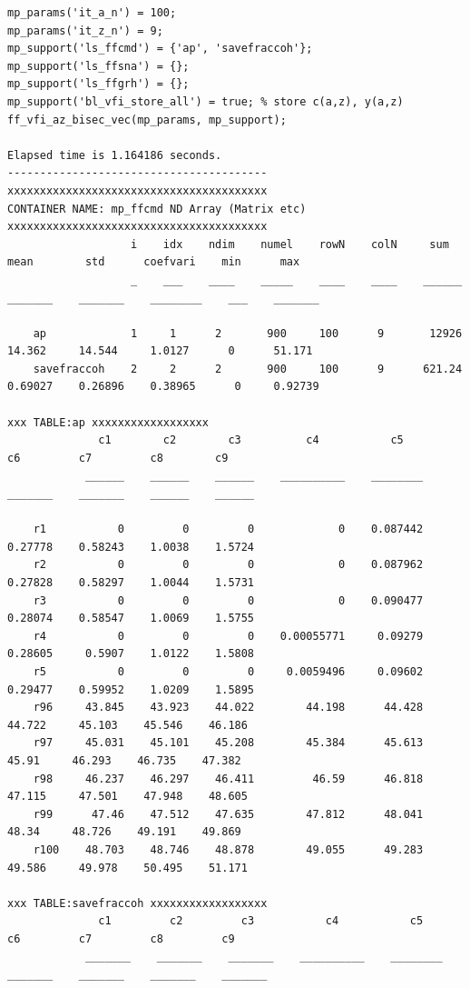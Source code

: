 \documentclass[
]{book}
\begin{document}
\begin{verbatim}
mp_params('it_a_n') = 100;
mp_params('it_z_n') = 9;
mp_support('ls_ffcmd') = {'ap', 'savefraccoh'};
mp_support('ls_ffsna') = {};
mp_support('ls_ffgrh') = {};
mp_support('bl_vfi_store_all') = true; % store c(a,z), y(a,z)
ff_vfi_az_bisec_vec(mp_params, mp_support);

Elapsed time is 1.164186 seconds.
----------------------------------------
xxxxxxxxxxxxxxxxxxxxxxxxxxxxxxxxxxxxxxxx
CONTAINER NAME: mp_ffcmd ND Array (Matrix etc)
xxxxxxxxxxxxxxxxxxxxxxxxxxxxxxxxxxxxxxxx
                   i    idx    ndim    numel    rowN    colN     sum       mean        std      coefvari    min      max  
                   _    ___    ____    _____    ____    ____    ______    _______    _______    ________    ___    _______

    ap             1     1      2       900     100      9       12926     14.362     14.544     1.0127      0      51.171
    savefraccoh    2     2      2       900     100      9      621.24    0.69027    0.26896    0.38965      0     0.92739

xxx TABLE:ap xxxxxxxxxxxxxxxxxx
              c1        c2        c3          c4           c5         c6         c7         c8        c9  
            ______    ______    ______    __________    ________    _______    _______    ______    ______

    r1           0         0         0             0    0.087442    0.27778    0.58243    1.0038    1.5724
    r2           0         0         0             0    0.087962    0.27828    0.58297    1.0044    1.5731
    r3           0         0         0             0    0.090477    0.28074    0.58547    1.0069    1.5755
    r4           0         0         0    0.00055771     0.09279    0.28605     0.5907    1.0122    1.5808
    r5           0         0         0     0.0059496     0.09602    0.29477    0.59952    1.0209    1.5895
    r96     43.845    43.923    44.022        44.198      44.428     44.722     45.103    45.546    46.186
    r97     45.031    45.101    45.208        45.384      45.613      45.91     46.293    46.735    47.382
    r98     46.237    46.297    46.411         46.59      46.818     47.115     47.501    47.948    48.605
    r99      47.46    47.512    47.635        47.812      48.041      48.34     48.726    49.191    49.869
    r100    48.703    48.746    48.878        49.055      49.283     49.586     49.978    50.495    51.171

xxx TABLE:savefraccoh xxxxxxxxxxxxxxxxxx
              c1         c2         c3           c4           c5         c6         c7         c8         c9   
            _______    _______    _______    __________    ________    _______    _______    _______    _______


\end{verbatim}
\end{document}
